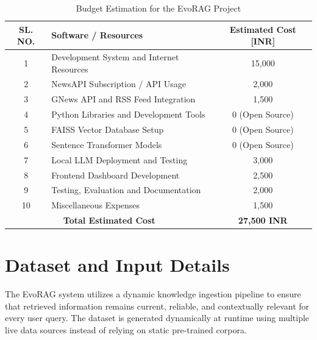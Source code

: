 \begin{appendices}
\begin{table}[H]
\begin{tabular}{|c|p{8cm}|c|}
\textbf{SL. NO.} &
\centering \textbf{Software / Resources} &
\textbf{Estimated Cost [INR]}
\tabularnewline

\hline

1 & Development System and Internet Resources & 15,000 \\
\hline

2 & NewsAPI Subscription / API Usage & 2,000 \\
\hline

3 & GNews API and RSS Feed Integration & 1,500 \\
\hline

4 & Python Libraries and Development Tools & 0 (Open Source) \\
\hline

5 & FAISS Vector Database Setup & 0 (Open Source) \\
\hline

6 & Sentence Transformer Models & 0 (Open Source) \\
\hline

7 & Local LLM Deployment and Testing & 3,000 \\
\hline

8 & Frontend Dashboard Development & 2,500 \\
\hline

9 & Testing, Evaluation and Documentation & 2,000 \\
\hline

10 & Miscellaneous Expenses & 1,500 \\
\hline

\multicolumn{2}{|c|}{\textbf{Total Estimated Cost}} &
\textbf{27,500 INR} \\
\hline

\end{tabular}

\vspace{0.5cm}

\caption{Budget Estimation for the EvoRAG Project}
\label{tab:budget_estimation}

\end{table}


\chapter{Dataset and Input Details}

The EvoRAG system utilizes a dynamic knowledge ingestion pipeline to ensure that retrieved information remains current, reliable, and contextually relevant for every user query. 
The dataset is generated dynamically at runtime using multiple live data sources instead of relying on static pre-trained corpora.


\end{appendices}
